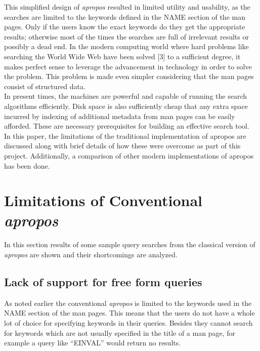 \documentclass[letterpaper,twocolumn,10pt]{article}
\begin{document}
This simplified design of \textit{apropos} resulted in limited utility and
usability, as the searches are limited to the keywords defined in the NAME
section of the man pages. Only if the users know the exact keywords do they get
the appropriate results; otherwise most of
the times the searches are full of irrelevant results or possibly a dead end. 
In the modern
computing world where hard problems like searching the World Wide Web have been
solved [3] to a sufficient degree, it makes perfect sense to leverage the
advancement in technology in order to solve the problem. This problem is made
even simpler considering that the man pages consist of structured data. \\

In present times, the machines are powerful and  capable of running the search
algorithms efficiently. Disk
space is also sufficiently cheap that any extra space incurred by indexing of
additional metadata from man pages
can be easily afforded. These are necessary prerequisites for building an
effective search tool. \\

In this paper, the limitations of the traditional implementation of apropos
are discussed along with brief details of how these were overcome as part of
this project. Additionally, a comparison of other modern implementations of apropos has been done. \\

\section{Limitations of Conventional \textit{apropos}}
In this section results of some sample query searches from
the classical version of \textit{apropos} are shown and their shortcomings are
analyzed. \\

\subsection{Lack of support for free form queries}
As noted earlier the conventional \textit{apropos} is limited to the keywords
used in the NAME section of the man pages. This means that the users do not have
a whole lot of choice for specifying keywords in their queries. Besides they
cannot search for keywords which are not usually specified in the title of a man
page, for example a query like ``EINVAL'' would return no results. \\
\end{document}
